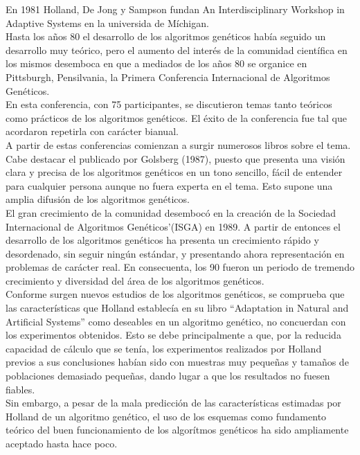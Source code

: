 \documentclass[12pt]{article} \usepackage[utf8x]{inputenc}
\begin{document}
En 1981 Holland, De Jong y Sampson fundan An Interdisciplinary Workshop in Adaptive Systems 
en la universida de Míchigan.\\


 Hasta los años 80 el desarrollo de los algoritmos genéticos
había seguido un desarrollo muy teórico, pero el aumento del interés de la comunidad científica 
en los mismos desemboca en que a mediados de los años 80  se organice
en Pittsburgh, Pensilvania, la Primera Conferencia Internacional de Algoritmos Genéticos.\\

En esta conferencia, con 75 participantes, se discutieron temas tanto teóricos como prácticos
de los algoritmos genéticos. El éxito de la conferencia fue tal que acordaron repetirla con 
carácter bianual.\\

A partir de estas conferencias comienzan a surgir numerosos libros sobre el tema. Cabe destacar
el publicado por Golsberg (1987), puesto que presenta una visión clara y precisa de los algoritmos
genéticos en un tono sencillo, fácil de entender para cualquier persona aunque no fuera experta
en el tema. Esto supone una amplia 
difusión de los algoritmos genéticos.\\

El gran crecimiento de la comunidad desembocó en la creación de la Sociedad Internacional de 
Algoritmos Genéticos'(ISGA) en 1989. A partir de entonces el desarrollo de los algoritmos 
genéticos ha presenta un crecimiento rápido y desordenado, sin seguir ningún estándar, y presentando
ahora representación en problemas de carácter real. En consecuenta, los 90 fueron un periodo de tremendo
crecimiento y diversidad del área de los algoritmos genéticos. \\


Conforme surgen nuevos estudios de los algoritmos genéticos, se comprueba que las características
que Holland establecía en su libro ``Adaptation in Natural and Artificial Systems'' como deseables
en un algoritmo genético, no concuerdan con los experimentos obtenidos. Esto se debe principalmente
a que, por la reducida capacidad de cálculo que se tenía, los experimentos realizados por Holland
previos a sus conclusiones habían sido con muestras muy pequeñas y tamaños de poblaciones demasiado
pequeñas, dando lugar a que los resultados no fuesen fiables. \\

Sin embargo, a pesar de la mala predicción de las características estimadas por Holland de un 
algoritmo genético, el uso de los esquemas como fundamento teórico del buen funcionamiento de los
algorítmos genéticos ha sido ampliamente aceptado hasta hace poco.\\
\end{document}
